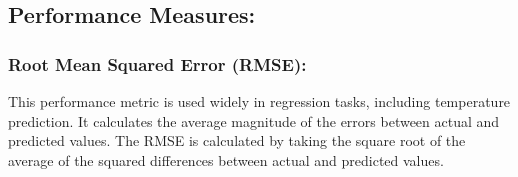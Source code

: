 \documentclass[sn-mathphys,Numbered]{sn-jnl}
\theoremstyle{thmstyleone}
\theoremstyle{thmstyletwo}
\theoremstyle{thmstylethree}
\begin{document}








\subsection{Performance Measures:}
\subsubsection{Root Mean Squared Error (RMSE):}
This performance metric is used widely in regression tasks, including temperature prediction. It calculates the average magnitude of the errors between actual and predicted values. The RMSE is calculated by taking the square root of the average of the squared differences between actual and predicted values.
\end{document}
